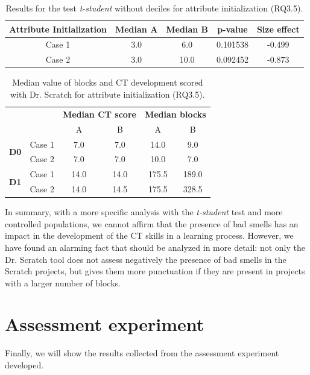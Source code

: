 \begin{table}
 \begin{center}
  \begin{tabular}{|c|c|c|c|c|}
    \hline
    \textbf{Attribute Initialization} & \textbf{Median A} & \textbf{Median B} & \textbf{p-value} & \textbf{Size effect} \\ \hline
    Case 1 & 3.0 & 6.0 & 0.101538 & -0.499 \\ \hline
    Case 2 & 3.0 & 10.0 & 0.092452 & -0.873 \\ \hline
  \end{tabular}
  \caption{Results for the test \textit{t-student} without deciles for attribute initialization (RQ3.5).}
  \label{table:rq3_5_statistical_results}
 \end{center}
\end{table}

\begin{table}
 \begin{center}
  \begin{tabular}{|c|c|c|c|c|c|}
    \cline{3-6}
     \multicolumn{2}{c}{} & 
     \multicolumn{2}{|c|}{\textbf{Median CT score}} & \multicolumn{2}{|c|}{\textbf{Median blocks}} \\ 
     \cline{3-6}
     \multicolumn{2}{c|}{} & A & B & A & B \\ \hline
     \multirow{2}{*}{\textbf{D0}}
     & Case 1 & 7.0 & 7.0 & 14.0 & 9.0 \\
     & Case 2 & 7.0 & 7.0 & 10.0 & 7.0 \\ \hline
     \multirow{2}{*}{\textbf{D1}}
     & Case 1 & 14.0 & 14.0 & 175.5 & 189.0 \\
     & Case 2 & 14.0 & 14.5 & 175.5 & 328.5 \\ \hline
  \end{tabular}
  \caption{Median value of blocks and CT development scored with Dr. Scratch for attribute initialization (RQ3.5).}
  \label{table:rq3_5_statistical_results_median}
 \end{center}
\end{table}

\hfill

In summary, with a more specific analysis with the \textit{t-student} test and more controlled populations, we cannot affirm that the presence of bad smells has an impact in the development of the CT skills in a learning process. However, we have found an alarming fact that should be analyzed in more detail: not only the Dr. Scratch tool does not assess negatively the presence of bad smells in the Scratch projects, but gives them more punctuation if they are present in projects with a larger number of blocks.

\section{Assessment experiment}
\label{sec:results_experiment}

Finally, we will show the results collected from the assessment experiment developed. 
